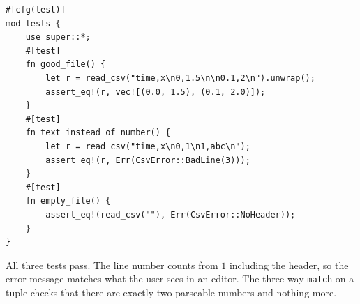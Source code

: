 \begin{enumerate}[label=\textbf{\ansnum.\arabic*}]
\begin{verbatim}
#[cfg(test)]
mod tests {
    use super::*;
    #[test]
    fn good_file() {
        let r = read_csv("time,x\n0,1.5\n\n0.1,2\n").unwrap();
        assert_eq!(r, vec![(0.0, 1.5), (0.1, 2.0)]);
    }
    #[test]
    fn text_instead_of_number() {
        let r = read_csv("time,x\n0,1\n1,abc\n");
        assert_eq!(r, Err(CsvError::BadLine(3)));
    }
    #[test]
    fn empty_file() {
        assert_eq!(read_csv(""), Err(CsvError::NoHeader));
    }
}
\end{verbatim}
All three tests pass. The line number counts from $1$ including the header, so the error message matches what the user sees in an editor. The three-way \verb!match! on a tuple checks that there are exactly two parseable numbers and nothing more.
\end{enumerate}
